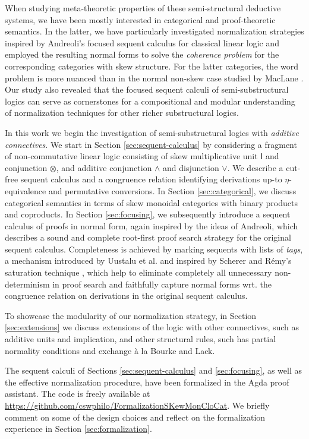 \documentclass[submission,copyright,creativecommons]{eptcs}
\theoremstyle{definition}
\newcommand{\ot}{\otimes}
\newcommand{\I}{\mathsf{I}}
\begin{document}
When studying meta-theoretic properties of these semi-structural deductive systems, we have been mostly interested in categorical and proof-theoretic semantics. In the latter, we have particularly investigated normalization strategies inspired by Andreoli's focused sequent calculus for classical linear logic \cite{andreoli:logic:1992} and employed the resulting normal forms to solve the \emph{coherence problem} for the corresponding categories with skew structure. For the latter categories, the word problem is more nuanced than in the normal non-skew case studied by MacLane \cite{maclane1963natural}. Our study also revealed that the focused sequent calculi of semi-substructural logics can serve as cornerstones for a compositional and modular understanding of normalization techniques for other richer substructural logics.

In this work we begin the investigation of  semi-substructural logics with \emph{additive connectives}. We start in Section \ref{sec:sequent-calculus} by considering a fragment of non-commutative linear logic consisting of skew multiplicative unit $\I$ and conjunction $\ot$, and additive conjunction $\land$ and disjunction $\lor$. We describe a cut-free sequent calculus and a congruence relation identifying derivations up-to $\eta$-equivalence and permutative conversions. In Section \ref{sec:categorical}, we discuss categorical semantics in terms of skew monoidal categories with binary products and coproducts. In Section \ref{sec:focusing}, we subsequently introduce a sequent calculus of proofs in normal form, again inspired by the ideas of Andreoli, which describes a sound and complete root-first proof search strategy for the original sequent calculus. Completeness is achieved by marking sequents with lists of \emph{tags}, a mechanism introduced by Uustalu et al. \cite{UVW:protsn} and inspired by Scherer and R{\'e}my's saturation technique \cite{scherer:simple:2015}, which help to  eliminate completely all unnecessary non-determinism in proof search and faithfully capture normal forms wrt. the congruence relation on derivations in the original sequent calculus. %

To showcase the modularity of our normalization strategy, in Section \ref{sec:extensions} we discuss extensions of the logic with other connectives, such as additive units and implication, and other structural rules, such has partial normality conditions and exchange {\`a} la Bourke and Lack.

The sequent calculi of Sections \ref{sec:sequent-calculus} and \ref{sec:focusing}, as well as the effective normalization procedure, have been formalized in the Agda proof assistant. The code is freely available at
  \url{https://github.com/cswphilo/FormalizationSKewMonCloCat}.
We briefly comment on some of the design choices and reflect on the formalization experience in Section \ref{sec:formalization}. 
\end{document}
